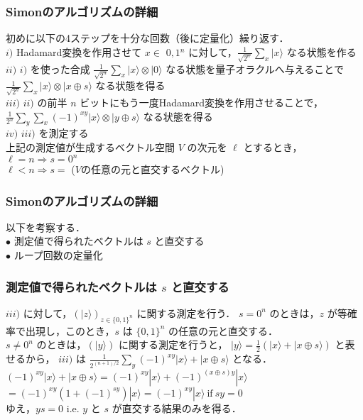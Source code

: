 \documentclass[dvipdfmx,12pt]{beamer}%
\begin{document}
\begin{frame}

\frametitle{Simonのアルゴリズムの詳細}
                  
初めに以下の4ステップを十分な回数（後に定量化）繰り返す． \\
$i)$  Hadamard変換を作用させて $ x \in $ {$ 0, 1 $}$^n$ に対して，$ \displaystyle \frac{1}{\sqrt{2^n}} \sum_x | x \rangle $ なる状態を作る  \\
$ii)$  $i)$ を使った合成 $ \displaystyle \frac{1}{\sqrt{2^n}} \sum_x | x \rangle \otimes | 0 \rangle $ なる状態を量子オラクルへ与えることで $ \displaystyle \frac{1}{\sqrt{2^n}} \sum_x | x \rangle \otimes | x \oplus s \rangle $ なる状態を得る \\
$iii)$ $ii)$ の前半 $n$ ビットにもう一度Hadamard変換を作用させることで，$ \displaystyle \frac{1}{2^n} \sum_y \sum_x (-1)^{xy} | x \rangle \otimes | y \oplus s \rangle $ なる状態を得る \\
$iv)$ $iii)$ を測定する \\
  
上記の測定値が生成するベクトル空間 $V$ の次元を $ \ell $ とするとき，\\
$ \ell = n \Rightarrow s = 0^n $ \\
$ \ell < n \Rightarrow s = $ ($V$の任意の元と直交するベクトル)

\end{frame}


\begin{frame}

\frametitle{Simonのアルゴリズムの詳細}
                      
以下を考察する． \\
$ \bullet $ 測定値で得られたベクトルは $s$ と直交する \\
$ \bullet $ ループ回数の定量化
    
\end{frame}


\begin{frame}

\frametitle{測定値で得られたベクトルは $s$ と直交する}
                          
$iii)$ に対して，$ (| z \rangle)_{z \in \{ 0, 1 \}^n } $ に関する測定を行う．
$ s = 0^n $ のときは，$z$ が等確率で出現し，このとき，$s$ は $ \{ 0, 1 \}^n $ の任意の元と直交する．\\
$ s \neq 0^n $ のときは，$(| y \rangle)$ に関する測定を行うと，
$ \displaystyle | y \rangle = \frac{1}{2} ( | x \rangle + | x \oplus s \rangle ) $ と表せるから，
$iii)$ は $ \displaystyle \frac{1}{2^{(n + 1)/2}} \sum_y (-1)^{xy} | x \rangle + | x \oplus s \rangle $ となる．\\
$ (-1)^{xy} | x \rangle + | x \oplus s \rangle = (-1)^{xy} | x \rangle + (-1)^{(x \oplus s)y} | x \rangle $  
$ = (-1)^{xy} (1 + (-1)^{sy} ) | x \rangle = (-1)^{xy} | x \rangle \ \mathrm{if} \ sy = 0 $ \\
        
ゆえ，$ ys = 0 $ i.e. $ y $ と $s$ が直交する結果のみを得る．

\end{frame}
\end{document}
